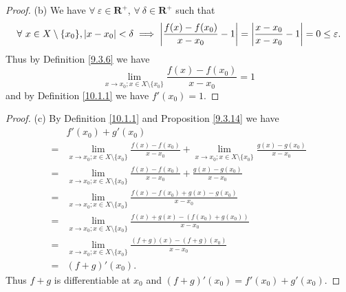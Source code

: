 \begin{proof}{(b)}
    We have \(\forall\ \varepsilon \in \mathbf{R}^+\), \(\forall\ \delta \in \mathbf{R}^+\) such that
    \[
        \forall\ x \in X \setminus \{x_0\}, \abs*{x - x_0} < \delta \implies \abs*{\frac{f(x) - f(x_0)}{x - x_0} - 1} = \abs*{\frac{x - x_0}{x - x_0} - 1} = 0 \leq \varepsilon.
    \]
    Thus by Definition \ref{9.3.6} we have
    \[
        \lim_{x \to x_0 ; x \in X \setminus \{x_0\}} \frac{f(x) - f(x_0)}{x - x_0} = 1
    \]
    and by Definition \ref{10.1.1} we have \(f'(x_0) = 1\).
\end{proof}

\begin{proof}{(c)}
    By Definition \ref{10.1.1} and Proposition \ref{9.3.14} we have
    \begin{align*}
          & f'(x_0) + g'(x_0)                                                                                                                                       \\
        = & \lim_{x \to x_0 ; x \in X \setminus \{x_0\}} \frac{f(x) - f(x_0)}{x - x_0} + \lim_{x \to x_0 ; x \in X \setminus \{x_0\}} \frac{g(x) - g(x_0)}{x - x_0} \\
        = & \lim_{x \to x_0 ; x \in X \setminus \{x_0\}} \frac{f(x) - f(x_0)}{x - x_0} + \frac{g(x) - g(x_0)}{x - x_0}                                              \\
        = & \lim_{x \to x_0 ; x \in X \setminus \{x_0\}} \frac{f(x) - f(x_0) + g(x) - g(x_0)}{x - x_0}                                                              \\
        = & \lim_{x \to x_0 ; x \in X \setminus \{x_0\}} \frac{f(x) + g(x) - (f(x_0) + g(x_0))}{x - x_0}                                                            \\
        = & \lim_{x \to x_0 ; x \in X \setminus \{x_0\}} \frac{(f + g)(x) - (f + g)(x_0)}{x - x_0}                                                                  \\
        = & (f + g)'(x_0).
    \end{align*}
    Thus \(f + g\) is differentiable at \(x_0\) and \((f + g)'(x_0) = f'(x_0) + g'(x_0)\).
\end{proof}

